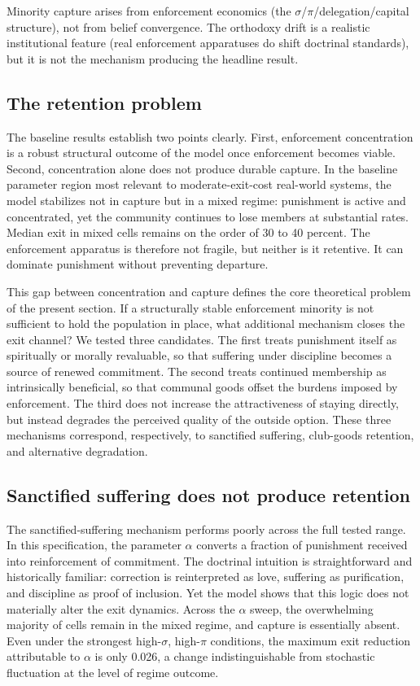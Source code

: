 \documentclass[12pt]{article}
\begin{document}
Minority capture arises from enforcement economics (the $\sigma$/$\pi$/delegation/capital structure), not from belief convergence. The orthodoxy drift is a realistic institutional feature (real enforcement apparatuses do shift doctrinal standards), but it is not the mechanism producing the headline result.

\subsection{The retention problem}

The baseline results establish two points clearly. First, enforcement concentration is a robust structural outcome of the model once enforcement becomes viable. Second, concentration alone does not produce durable capture. In the baseline parameter region most relevant to moderate-exit-cost real-world systems, the model stabilizes not in capture but in a mixed regime: punishment is active and concentrated, yet the community continues to lose members at substantial rates. Median exit in mixed cells remains on the order of 30 to 40 percent. The enforcement apparatus is therefore not fragile, but neither is it retentive. It can dominate punishment without preventing departure.

This gap between concentration and capture defines the core theoretical problem of the present section. If a structurally stable enforcement minority is not sufficient to hold the population in place, what additional mechanism closes the exit channel? We tested three candidates. The first treats punishment itself as spiritually or morally revaluable, so that suffering under discipline becomes a source of renewed commitment. The second treats continued membership as intrinsically beneficial, so that communal goods offset the burdens imposed by enforcement. The third does not increase the attractiveness of staying directly, but instead degrades the perceived quality of the outside option. These three mechanisms correspond, respectively, to sanctified suffering, club-goods retention, and alternative degradation.

\subsection{Sanctified suffering does not produce retention}

The sanctified-suffering mechanism performs poorly across the full tested range. In this specification, the parameter $\alpha$ converts a fraction of punishment received into reinforcement of commitment. The doctrinal intuition is straightforward and historically familiar: correction is reinterpreted as love, suffering as purification, and discipline as proof of inclusion. Yet the model shows that this logic does not materially alter the exit dynamics. Across the $\alpha$ sweep, the overwhelming majority of cells remain in the mixed regime, and capture is essentially absent. Even under the strongest high-$\sigma$, high-$\pi$ conditions, the maximum exit reduction attributable to $\alpha$ is only 0.026, a change indistinguishable from stochastic fluctuation at the level of regime outcome.
\end{document}

